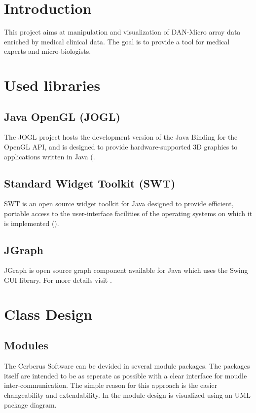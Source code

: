 \chapter{Introduction}

This project aims at manipulation and visualization of DAN-Micro array data enriched by medical clinical data. The goal is to provide a tool for medical experts and micro-biologists.

\chapter{Used libraries}

\section{Java OpenGL (JOGL)}

The JOGL project hosts the development version of the Java Binding for the OpenGL API, and is designed to provide hardware-supported 3D graphics to applications written in Java (\citep{jogl:06}.

\section{Standard Widget Toolkit (SWT)}

SWT is an open source widget toolkit for Java designed to provide efficient, portable access to the user-interface facilities of the operating systems on which it is implemented (\citep{swt:06}).

\section{JGraph}

JGraph is open source graph component available for Java which uses the Swing GUI library. For more details visit \citep{jgraph:06}. 

\chapter{Class Design}

\section{Modules}

The Cerberus Software can be devided in several module packages.
The packages itself are intended to be as seperate as possible with a clear interface for moudle inter-communication. 
The simple reason for this approach is the easier changeability and extendability.
In  the module design is visualized using an UML package diagram.

